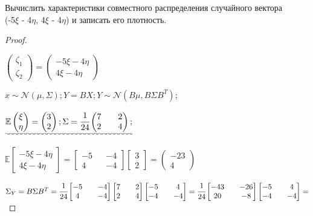 \begin{problem}
	Вычислить характеристики совместного распределения случайного вектора \\ (-5$\xi$ - 4$\eta$, 4$\xi$ - 4$\eta$) и записать его плотность. 
\end{problem}

\begin{proof}
	$ $
	
	$ \begin{pmatrix} \zeta_1 \\ \zeta_2 \end{pmatrix}=\begin{pmatrix} -5\xi-4\eta \\ 4\xi-4\eta \end{pmatrix} $
	
	$ x \sim \mathscr{N}(\mu, \Sigma); Y=BX; Y \sim \mathscr{N}(B\mu, B\Sigma B^T); $
	
	$ \uwave{\mathbb E\begin{pmatrix} \xi \\ \eta \end{pmatrix} = \begin{pmatrix} 3 \\ 2 \end{pmatrix}; \Sigma = \cfrac1{24}
	\begin{pmatrix} 7 && 2 \\ 2 && 4 \end{pmatrix};} $ 	

	$ \mathbb E\begin{bmatrix} -5\xi-4\eta \\ 4\xi-4\eta \end{bmatrix}=\begin{bmatrix} -5 && -4 \\ 4 && -4 \end{bmatrix}\begin{bmatrix} 3 \\ 2 \end{bmatrix}=\begin{pmatrix} -23 \\ 4 \end{pmatrix}$	
	
	$ \Sigma_Y=B \Sigma B^T=\cfrac1{24}\begin{bmatrix} -5 && -4 \\ 4 && -4 \end{bmatrix}\begin{bmatrix} 7 && 2 \\ 2 && 4 \end{bmatrix}\begin{bmatrix} -5 && 4 \\ -4 && -4 \end{bmatrix}=\cfrac1{24}\begin{bmatrix} -43 && -26 \\ 20 && -8 \end{bmatrix}\begin{bmatrix} -5 && 4 \\ -4 && -4 \end{bmatrix}=$ 	
	

\end{proof}
